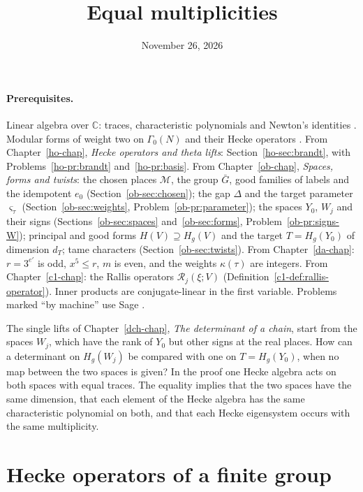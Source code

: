 \documentclass[reqno]{amsart}
\title{Equal multiplicities}
\author{}
\date{November 26, 2026}
\newcounter{chap}
\theoremstyle{plain}
\theoremstyle{definition}
\newcommand{\C}{\mathbb{C}}
\newcommand{\Mcal}{\mathcal{M}}
\newcommand{\Rc}{\mathcal{R}}
\begin{document}
\maketitle
{}\label{chap}

\paragraph{Prerequisites.}
Linear algebra over \(\C\): traces, characteristic polynomials and Newton's identities \cite[Ch.~I, \S2]{Mac}.  Modular forms of weight two on \(\Gamma_0(N)\) and their Hecke operators \cite[Ch.~5]{DS}.  From Chapter~\ref{ho-chap}, \emph{Hecke operators and theta lifts}: Section~\ref{ho-sec:brandt}, with Problems~\ref{ho-pr:brandt} and~\ref{ho-pr:basis}.  From Chapter~\ref{ob-chap}, \emph{Spaces, forms and twists}: the chosen places \(\Mcal\), the group \(\bar G\), good families of labels and the idempotent \(e_0\) (Section~\ref{ob-sec:chosen}); the gap \(\Delta\) and the target parameter \(\varsigma_\tau\) (Section~\ref{ob-sec:weights}, Problem~\ref{ob-pr:parameter}); the spaces \(Y_0\), \(W_j\) and their signs (Sections~\ref{ob-sec:spaces} and~\ref{ob-sec:forms}, Problem~\ref{ob-pr:signs-W}); principal and good forms \(H(V) \supseteq H_g(V)\) and the target \(T = H_g(Y_0)\) of dimension \(d_T\); tame characters (Section~\ref{ob-sec:twists}).  From Chapter~\ref{da-chap}: \(r = 3^{e'}\) is odd, \(x^5 \le r\), \(m\) is even, and the weights \(\kappa(\tau)\) are integers.  From Chapter~\ref{c1-chap}: the Rallis operators \(\Rc_j(\xi; V)\) (Definition~\ref{c1-def:rallis-operator}).  Inner products are conjugate-linear in the first variable.  Problems marked ``by machine'' use Sage \cite{Sage}.

\medskip
The single lifts of Chapter~\ref{dch-chap}, \emph{The determinant of a chain}, start from the spaces \(W_j\), which have the rank of \(Y_0\) but other signs at the real places.  How can a determinant on \(H_g(W_j)\) be compared with one on \(T = H_g(Y_0)\), when no map between the two spaces is given?  In the proof one Hecke algebra acts on both spaces with equal traces.  The equality implies that the two spaces have the same dimension, that each element of the Hecke algebra has the same characteristic polynomial on both, and that each Hecke eigensystem occurs with the same multiplicity.

\section{Hecke operators of a finite group}\label{sec:finite}
\end{document}
